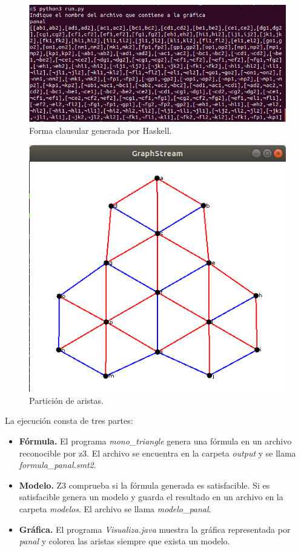\documentclass{article}
\begin{document}
\begin{figure}[htbp]
\begin{center}
\includegraphics[scale=0.4]{clausulas}
\caption{Forma clausular generada por Haskell.}
\label{fnc}
\end{center}
\end{figure}

\begin{figure}[htbp]
\begin{center}
\includegraphics[scale=0.4]{GraphStream}
\caption{Partición de aristas.}
\label{particion}
\end{center}
\end{figure}

La ejecución consta de tres partes:

\begin{itemize}
\item \textbf{Fórmula.} El programa \textit{mono\_triangle} genera una fórmula en un archivo reconocible por z3. El archivo se encuentra en la carpeta \textit{output} y se llama \textit{formula\_panal.smt2}.
\item \textbf{Modelo.} Z3 comprueba si la fórmula generada es satisfacible. Si es satisfacible genera un modelo y guarda el resultado en un archivo en la carpeta \textit{modelos}. El archivo se llama \textit{modelo\_panal}.
\item \textbf{Gráfica.} El programa \textit{Visualiza.java} muestra la gráfica representada por \textit{panal} y colorea las aristas siempre que exista un modelo.
\end{itemize}
\end{document}
